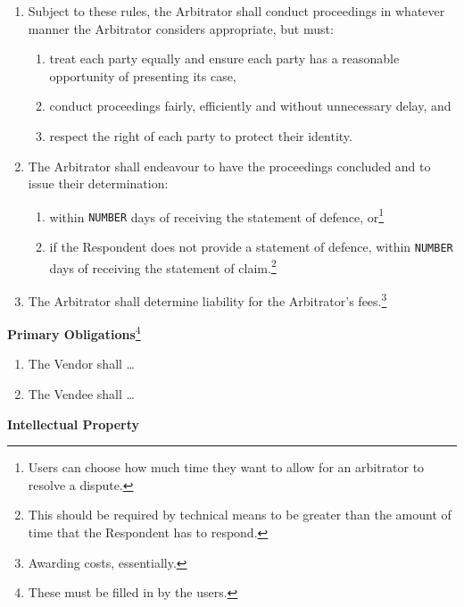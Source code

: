 \documentclass[a4paper,12pt]{article}
\begin{document}
\begin{enumerate}[resume]
\begin{enumerate}
		\item Subject to these rules, the Arbitrator shall conduct proceedings in whatever manner the Arbitrator considers appropriate, but must:
		\begin{enumerate}
			\item treat each party equally and ensure each party has a reasonable opportunity of presenting its case,
			\item conduct proceedings fairly, efficiently and without unnecessary delay, and
			\item respect the right of each party to protect their identity.
		\end{enumerate}
		\item The Arbitrator shall endeavour to have the proceedings concluded and to issue their determination:
		\begin{enumerate}
			\item within \texttt{\colorbox{branding}{NUMBER}} days of receiving the statement of defence, or\footnote{Users can choose how much time they want to allow for an arbitrator to resolve a dispute.}
			\item if the Respondent does not provide a statement of defence, within \texttt{\colorbox{branding}{NUMBER}} days of receiving the statement of claim.\footnote{This should be required by technical means to be greater than the amount of time that the Respondent has to respond.}
		\end{enumerate}
		\item The Arbitrator shall determine liability for the Arbitrator's fees.\footnote{Awarding costs, essentially.}
	\end{enumerate}
\end{enumerate}

\textbf{Primary Obligations}\footnote{These must be filled in by the users.}

\begin{enumerate}[resume]
	\item The Vendor shall \ldots{}
	\item The Vendee shall \ldots{}
\end{enumerate}

\textbf{Intellectual Property}
\end{document}

